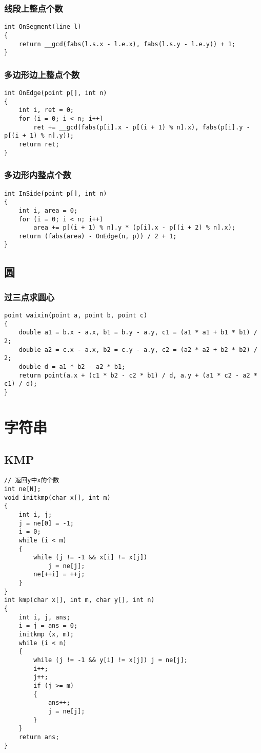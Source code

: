 \documentclass[a4]{article}
\begin{document}
\subsubsection{线段上整点个数}
\begin{lstlisting}
int OnSegment(line l)
{
    return __gcd(fabs(l.s.x - l.e.x), fabs(l.s.y - l.e.y)) + 1;
}
\end{lstlisting}
\subsubsection{多边形边上整点个数}
\begin{lstlisting}
int OnEdge(point p[], int n)
{
    int i, ret = 0;
    for (i = 0; i < n; i++)
        ret += __gcd(fabs(p[i].x - p[(i + 1) % n].x), fabs(p[i].y - p[(i + 1) % n].y));
    return ret;
}
\end{lstlisting}
\subsubsection{多边形内整点个数}
\begin{lstlisting}
int InSide(point p[], int n)
{
    int i, area = 0;
    for (i = 0; i < n; i++)
        area += p[(i + 1) % n].y * (p[i].x - p[(i + 2) % n].x);
    return (fabs(area) - OnEdge(n, p)) / 2 + 1;
}
\end{lstlisting}
\subsection{圆}
\subsubsection{过三点求圆心}
\begin{lstlisting}
point waixin(point a, point b, point c)
{
    double a1 = b.x - a.x, b1 = b.y - a.y, c1 = (a1 * a1 + b1 * b1) / 2;
    double a2 = c.x - a.x, b2 = c.y - a.y, c2 = (a2 * a2 + b2 * b2) / 2;
    double d = a1 * b2 - a2 * b1;
    return point(a.x + (c1 * b2 - c2 * b1) / d, a.y + (a1 * c2 - a2 * c1) / d);
}
\end{lstlisting}
\clearpage\section{字符串}
\subsection{KMP}
\begin{lstlisting}
// 返回y中x的个数
int ne[N];
void initkmp(char x[], int m)
{
    int i, j;
    j = ne[0] = -1;
    i = 0;
    while (i < m)
    {
        while (j != -1 && x[i] != x[j])
            j = ne[j];
        ne[++i] = ++j;
    }
}
int kmp(char x[], int m, char y[], int n)
{
    int i, j, ans;
    i = j = ans = 0;
    initkmp (x, m);
    while (i < n)
    {
        while (j != -1 && y[i] != x[j]) j = ne[j];
        i++;
        j++;
        if (j >= m)
        {
            ans++;
            j = ne[j];
        }
    }
    return ans;
}
\end{lstlisting}
\end{document}
